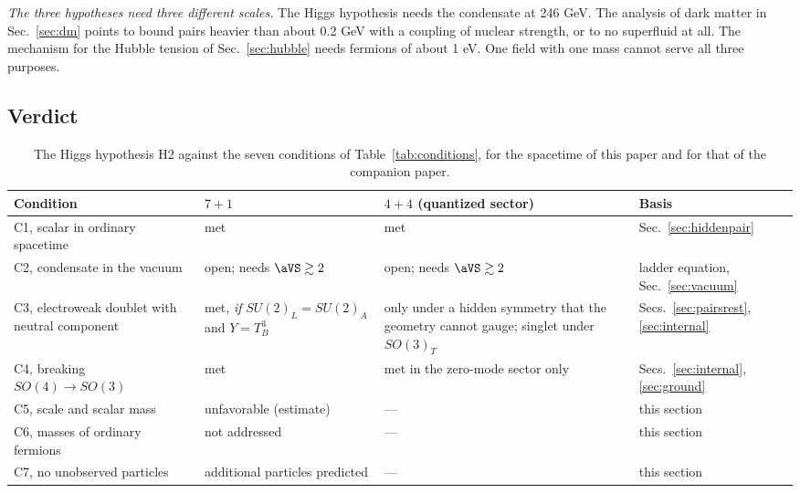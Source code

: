 \emph{The three hypotheses need three different scales.} The Higgs hypothesis needs the condensate at
246 GeV. The analysis of dark matter in Sec.~\ref{sec:dm} points to bound pairs heavier than about
0.2 GeV with a coupling of nuclear strength, or to no superfluid at all. The mechanism for the Hubble
tension of Sec.~\ref{sec:hubble} needs fermions of about 1 eV. One field with one mass cannot serve
all three purposes.

\subsection{Verdict}

\begin{table}
\caption{\label{tab:verdict}The Higgs hypothesis H2 against the seven conditions of
Table~\ref{tab:conditions}, for the spacetime of this paper and for that of the companion paper.}
\begin{ruledtabular}
\begin{tabular}{>{\raggedright\arraybackslash}p{}>{\raggedright\arraybackslash}p{}>{\raggedright\arraybackslash}p{}>{\raggedright\arraybackslash}p{}}
Condition & $7+1$ & $4+4$ (quantized sector) & Basis \\
\hline
C1, scalar in ordinary spacetime & met & met & Sec.~\ref{sec:hiddenpair} \\
C2, condensate in the vacuum & open; needs $\aVS\gtrsim2$ & open; needs $\aVS\gtrsim2$ & ladder equation, Sec.~\ref{sec:vacuum} \\
C3, electroweak doublet with neutral component & met, \emph{if} $SU(2)_L=SU(2)_A$ and $Y=T^3_B$ & only under a hidden symmetry that the geometry cannot gauge; singlet under $SO(3)_T$ & Secs.~\ref{sec:pairsrest}, \ref{sec:internal} \\
C4, breaking $SO(4)\to SO(3)$ & met & met in the zero-mode sector only & Secs.~\ref{sec:internal}, \ref{sec:ground} \\
C5, scale and scalar mass & unfavorable (estimate) & --- & this section \\
C6, masses of ordinary fermions & not addressed & --- & this section \\
C7, no unobserved particles & additional particles predicted & --- & this section \\
\end{tabular}
\end{ruledtabular}
\end{table}

